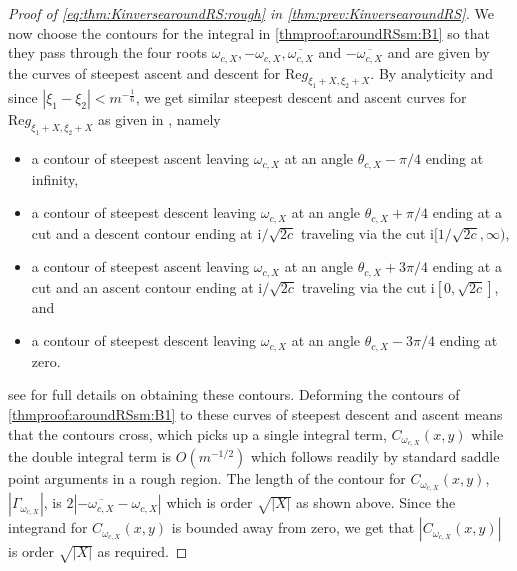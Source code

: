 \documentclass[11pt,twoside]{amsart}
\theoremstyle{plain}
\numberwithin{quest}{section}
\theoremstyle{remark}
\numberwithin{rem}{section}
\theoremstyle{definition}
\begin{document}
\begin{proof}[Proof of \eqref{eq:thm:KinversearoundRS:rough} in \cref{thm:prev:KinversearoundRS}]
We now choose the contours for the integral in \eqref{thmproof:aroundRSsm:B1} so that they pass through the four roots $\omega_{c,X},-\omega_{c,X}, \overline{\omega_{c,X}} $ and $-\overline{\omega_{c,X}}$ and are given by the curves of steepest ascent and descent for $\mathrm{Re}g_{\xi_1+X,\xi_2+X}$.   By analyticity and since $|\xi_1-\xi_2|<m^{-\frac{1}{6}}$, we get similar steepest descent and ascent curves for $\mathrm{Re}g_{\xi_1+X,\xi_2+X}$ as given in \cite[Lemma 3.20]{CJ16}, namely
\begin{itemize}
\item  a contour of steepest ascent leaving $\omega_{c,X}$ at an angle $\theta_{c,X}-\pi/4$ ending at infinity,
\item a contour of steepest descent leaving $\omega_{c,X}$  at an angle $\theta_{c,X}+\pi/4$ ending at a cut and a descent
contour ending at  $\mathrm{i}/\sqrt{2c}$  traveling via the cut $\mathrm{i}[1/\sqrt{2c},\infty)$,
\item a contour of steepest ascent leaving $\omega_{c,X}$  at an angle $\theta_{c,X}+3\pi/4$ ending at a cut and an ascent
contour ending at $\mathrm{i}/\sqrt{2c}$ traveling via the cut $\mathrm{i}[0,\sqrt{2c}]$, and
\item a contour of steepest descent leaving $\omega_{c,X}$  at an angle $\theta_{c,X}-3\pi/4$ ending at zero.
\end{itemize}
see \cite[Lemma 3.20]{CJ16} for full details on obtaining these contours.  Deforming the contours of \eqref{thmproof:aroundRSsm:B1} to these curves of steepest descent and ascent means that the contours cross, which picks up a single integral term, $C_{\omega_{c,X}}(x,y)$ while the double integral term is $O(m^{-1/2})$ which follows readily by standard saddle point arguments in a rough region.  The length of the contour for $C_{\omega_{c,X}}(x,y)$, $|\Gamma_{\omega_{c,X}}|$, is $2|-\overline{\omega_{c,X}}-\omega_{c,X}|$ which is order $\sqrt{|X|}$ as shown above. Since the integrand for $C_{\omega_{c,X}}(x,y)$ is bounded away from zero, we get that $|C_{\omega_{c,X}}(x,y)|$ is order $\sqrt{|X|}$ as required.  
	\end{proof}
	
	
	
\end{document}
